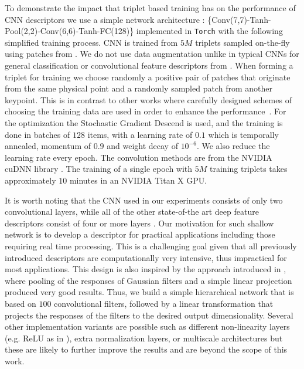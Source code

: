 To demonstrate the impact that triplet based training has on the performance of CNN descriptors we use a simple network architecture :
\{Conv(7,7)-Tanh-Pool(2,2)-Conv(6,6)-Tanh-FC(128)\} implemented in
\texttt{Torch} \cite{collobert:2011c} with the following simplified training process. 
CNN is trained from $5M$
triplets sampled on-the-fly using patches from
\cite{BHW10}. We do not use data
augmentation unlike in typical CNNs for general classification or convolutional feature descriptors from
\cite{ZagoruykoCVPR2015}\cite{Han_2015_CVPR}.  When forming a triplet for training we choose randomly a positive
pair of patches that originate from the same  physical point and  a
randomly sampled patch from another keypoint. This is in contrast to
other works where carefully designed schemes of choosing the training
data are used in order to enhance the
performance~\cite{DBLP:journals/corr/WangSLRWPCW14,Han_2015_CVPR}.
For the optimization the Stochastic Gradient Descend
\cite{bottou-tricks-2012} is used, and the training is done in batches
of $128$ items, with a learning rate of $0.1$ which is temporally
annealed, momentum of $0.9$ and weight decay of $10^{-6}$. We also
reduce the learning rate every epoch. The convolution methods are from
the NVIDIA cuDNN library \cite{DBLP:journals/corr/ChetlurWVCTCS14}.
The training of a single epoch with $5M$ training triplets takes
approximately $10$ minutes in an NVIDIA Titan X GPU.

It is worth noting that the CNN used in our experiments consists of
only two convolutional layers, while all of the other state-of-the art
deep feature descriptors consist of four or more layers
\cite{ZagoruykoCVPR2015,simo2015deepdesc,Han_2015_CVPR}.  Our
motivation for such shallow network is to develop a descriptor for
practical applications including those requiring real time
processing. This is a challenging goal given that all previously
introduced descriptors are computationally very intensive, thus
impractical for most applications.  This design is also inspired by
the approach introduced in \cite{simonyan2014learning}, where pooling
of the responses of Gaussian filters and a simple linear projection
produced very good results. Thus, we build a simple hierarchical
network that is based on $100$ convolutional filters, followed by a
linear transformation that projects the responses of the filters to
the desired output dimensionality.  Several other implementation
variants are possible such as different non-linearity layers
(e.g. ReLU as in \cite{Han_2015_CVPR,ZagoruykoCVPR2015}), extra
normalization layers, or multiscale architectures but these are likely
to further improve the results and are beyond the scope of this work.

